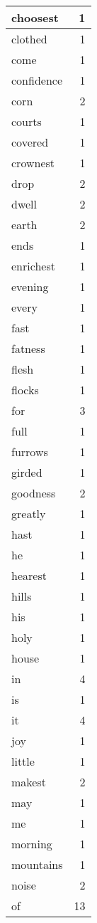 \begin{center}
\begin{longtable}{l|r}
choosest & 1 \\ \hline
clothed & 1 \\ \hline
come & 1 \\ \hline
confidence & 1 \\ \hline
corn & 2 \\ \hline
courts & 1 \\ \hline
covered & 1 \\ \hline
crownest & 1 \\ \hline
drop & 2 \\ \hline
dwell & 2 \\ \hline
earth & 2 \\ \hline
ends & 1 \\ \hline
enrichest & 1 \\ \hline
evening & 1 \\ \hline
every & 1 \\ \hline
fast & 1 \\ \hline
fatness & 1 \\ \hline
flesh & 1 \\ \hline
flocks & 1 \\ \hline
for & 3 \\ \hline
full & 1 \\ \hline
furrows & 1 \\ \hline
girded & 1 \\ \hline
goodness & 2 \\ \hline
greatly & 1 \\ \hline
hast & 1 \\ \hline
he & 1 \\ \hline
hearest & 1 \\ \hline
hills & 1 \\ \hline
his & 1 \\ \hline
holy & 1 \\ \hline
house & 1 \\ \hline
in & 4 \\ \hline
is & 1 \\ \hline
it & 4 \\ \hline
joy & 1 \\ \hline
little & 1 \\ \hline
makest & 2 \\ \hline
may & 1 \\ \hline
me & 1 \\ \hline
morning & 1 \\ \hline
mountains & 1 \\ \hline
noise & 2 \\ \hline
of & 13 \\ \hline

\end{longtable}
\end{center}

